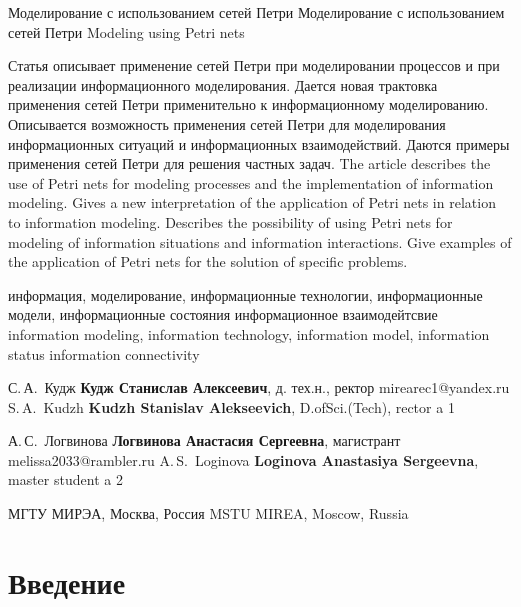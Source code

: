 
\usepackage{graphicx}
\usepackage[section]{placeins}



\Title
	{Моделирование с использованием сетей Петри}
	{Моделирование с использованием сетей Петри}
	{Modeling using Petri nets}

\Abstract
{
Статья описывает применение сетей Петри при моделировании процессов и при реализации информационного моделирования. Дается новая трактовка применения сетей Петри применительно к информационному моделированию. Описывается возможность применения сетей Петри для моделирования информационных ситуаций и информационных взаимодействий. Даются примеры применения сетей Петри для решения частных задач.
}
{
The article describes the use of Petri nets for modeling processes and the implementation of information modeling. Gives a new interpretation of the application of Petri nets in relation to information modeling. Describes the possibility of using Petri nets for modeling of information situations and information interactions. Give examples of the application of Petri nets for the solution of specific problems.
}

\Key		
  {информация, моделирование, информационные технологии, информационные модели, информационные состояния информационное взаимодейтсвие}
  {information modeling, information technology, information model, information status information connectivity}

\Author%
{С.\,А.~Кудж}
{\textbf{Кудж Станислав Алексеевич}, д. тех.н., ректор}
{mirearec1@yandex.ru}
{S.\,A.~Kudzh}
{\textbf{Kudzh Stanislav Alekseevich}, D.ofSci.(Tech), rector}
{a}
{1}

\Author%
{А.\,С.~Логвинова}
{\textbf{Логвинова Анастасия Сергеевна}, магистрант}
{ melissa2033@rambler.ru}
{A.\,S.~Loginova}
{\textbf{Loginova Anastasiya Sergeevna}, master student}
{a}
{2}

				{МГТУ МИРЭА, Москва, Россия}
				{MSTU MIREA, Moscow, Russia}



	\Header
	\captionsenglish
	\SubHeader
	\captionsrussian

\section*{Введение}

